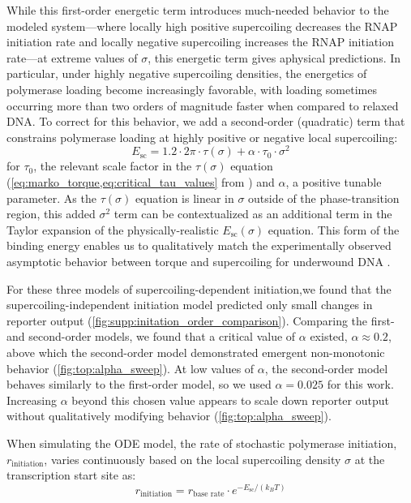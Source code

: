 \documentclass[11pt]{article} %
\begin{document}
While this first-order energetic term introduces much-needed behavior to the modeled system---where locally high positive supercoiling decreases the RNAP initiation rate and locally negative supercoiling increases the RNAP initiation rate---at extreme values of \(\sigma\), this energetic term gives aphysical predictions. In particular, under highly negative supercoiling densities, the energetics of polymerase loading become increasingly favorable, with loading sometimes occurring more than two orders of magnitude faster when compared to relaxed DNA. To correct for this behavior, we add a second-order (quadratic) term that constrains polymerase loading at highly positive or negative local supercoiling:
\begin{equation}
    E_\text{sc} = 1.2  \cdot 2\pi \cdot \tau(\sigma) + \alpha \cdot \tau_0 \cdot \sigma^2
\label{eq:second_order_sc_initation}
\end{equation}
for \(\tau_0\), the relevant scale factor in the \(\tau(\sigma)\) equation (\cref{eq:marko_torque,eq:critical_tau_values} from \parencite{markoTorqueDynamicsLinking2007}) and \(\alpha\), a positive tunable parameter. As the \(\tau(\sigma)\) equation is linear in \(\sigma\) outside of the phase-transition region, this added \(\sigma^2\) term can be contextualized as an additional term in the Taylor expansion of the physically-realistic \(E_\text{sc}(\sigma)\) equation. This form of the binding energy enables us to qualitatively match the experimentally observed asymptotic behavior between torque and supercoiling for underwound DNA \parencite{leSynergisticCoordinationChromatin2019}.

For these three models of supercoiling-dependent initiation,we found that the supercoiling-independent initiation model predicted only small changes in reporter output (\cref{fig:supp:initation_order_comparison}). Comparing the first- and second-order models, we found that a critical value of \(\alpha\) existed, \(\alpha \approx 0.2\), above which the second-order model demonstrated emergent non-monotonic behavior (\cref{fig:top:alpha_sweep}). At low values of \(\alpha\), the second-order model behaves similarly to the first-order model, so we used \(\alpha = 0.025\) for this work. Increasing \(\alpha\) beyond this chosen value appears to scale down reporter output without qualitatively modifying behavior (\cref{fig:top:alpha_sweep}).

When simulating the ODE model, the rate of stochastic polymerase initiation, \(r_\text{initiation}\), varies continuously based on the local supercoiling density \(\sigma\) at the transcription start site as:
\begin{equation}
    r_\text{initiation} = r_\text{base rate} \cdot e^{- E_\text{sc} / (k_B T)}
\label{eq:intermediate_init_rate}
\end{equation}
\end{document}
